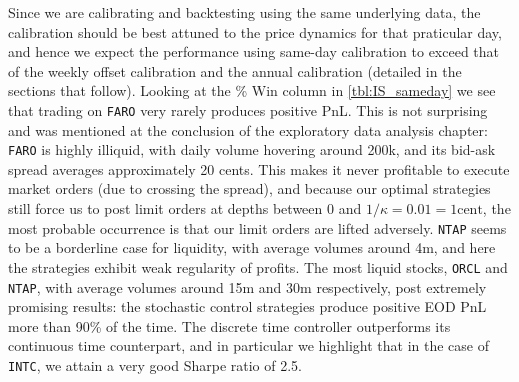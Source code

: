 Since we are calibrating and backtesting using the same underlying data, the calibration should be best attuned to the price dynamics for that praticular day, and hence we expect the performance using same-day calibration to exceed that of the weekly offset calibration and the annual calibration (detailed in the sections that follow). Looking at the \% Win column in \autoref{tbl:IS_sameday} we see that trading on \texttt{FARO} very rarely produces positive PnL. This is not surprising and was mentioned at the conclusion of the exploratory data analysis chapter: \texttt{FARO} is highly illiquid, with daily volume hovering around 200k, and its bid-ask spread averages approximately 20 cents. This makes it never profitable to execute market orders (due to crossing the spread), and because our optimal strategies still force us to post limit orders at depths between 0 and $1/\kappa = 0.01 = 1\text{cent}$, the most probable occurrence is that our limit orders are lifted adversely. \texttt{NTAP} seems to be a borderline case for liquidity, with average volumes around 4m, and here the strategies exhibit weak regularity of profits. The most liquid stocks, \texttt{ORCL} and \texttt{NTAP}, with average volumes around 15m and 30m respectively, post extremely promising results: the stochastic control strategies produce positive EOD PnL more than 90\% of the time. The discrete time controller outperforms its continuous time counterpart, and in particular we highlight that in the case of \texttt{INTC}, we attain a very good Sharpe ratio of 2.5.

